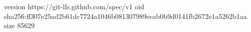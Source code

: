 version https://git-lfs.github.com/spec/v1
oid sha256:ff307e25ad2b61dc7724a1046b081307989ecab0b9d0141fb2672e1a5262b1aa
size 85629
